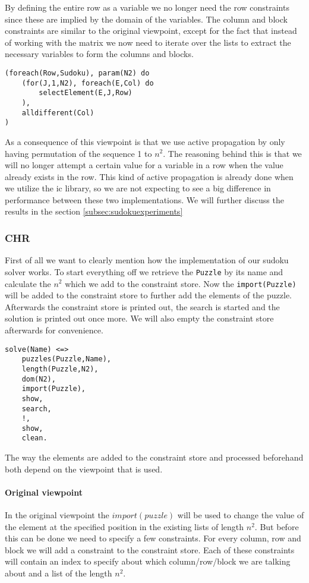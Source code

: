 By defining the entire row as a variable we no longer need the row constraints since these are implied by the domain of the variables.
The column and block constraints are similar to the original viewpoint, except for the fact that instead of working with the matrix we now need to iterate over the lists to extract the necessary variables to form the columns and blocks.

\begin{lstlisting}
(foreach(Row,Sudoku), param(N2) do
	(for(J,1,N2), foreach(E,Col) do
		selectElement(E,J,Row)
	),
	alldifferent(Col)
)
\end{lstlisting}

As a consequence of this viewpoint is that we use active propagation by only having permutation of the sequence 1 to $n^2$.
The reasoning behind this is that we will no longer attempt a certain value for a variable in a row when the value already exists in the row. 
This kind of active propagation is already done when we utilize the ic library, so we are not expecting to see a big difference in performance between these two implementations.
We will further discuss the results in the section \ref{subsec:sudokuexperiments}

\subsubsection{CHR}
First of all we want to clearly mention how the implementation of our sudoku solver works.
To start everything off we retrieve the \texttt{Puzzle} by its name and calculate the $n^2$ which we add to the constraint store.
Now the \texttt{import(Puzzle)} will be added to the constraint store to further add the elements of the puzzle.
Afterwards the constraint store is printed out, the search is started and the solution is printed out once more. 
We will also empty the constraint store afterwards for convenience.

\begin{lstlisting}
solve(Name) <=>
	puzzles(Puzzle,Name),
	length(Puzzle,N2),
	dom(N2),
	import(Puzzle),
	show,
	search,
	!,
	show,
	clean.
\end{lstlisting}

The way the elements are added to the constraint store and processed beforehand both depend on the viewpoint that is used.

\paragraph*{Original viewpoint}
In the original viewpoint the \texttt{$import(puzzle)$} will be used to change the value of the element at the specified position in the existing lists of length $n^{2}$. 
But before this can be done we need to specify a few constraints.
For every column, row and block we will add a constraint to the constraint store.
Each of these constraints will contain an index to specify about which column/row/block we are talking about and a list of the length $n^2$.\\

